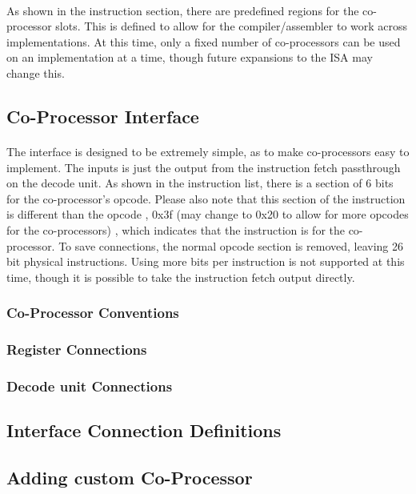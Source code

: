 \documentclass[letterpaper, 11pt]{article}
\begin{document}
\paragraph{}As shown in the instruction section, there are predefined regions for the co-processor slots. 
This is defined to allow for the compiler/assembler to work across implementations. At this time, only a fixed number of co-processors can be used on 
an implementation at a time, though future expansions to the ISA may change this.  

\subsection{Co-Processor Interface}
\paragraph{}The interface is designed to be extremely simple, as to make co-processors easy to implement. The inputs is just the output from the instruction fetch
passthrough on the decode unit. As shown in the instruction list, there is a section of 6 bits for the co-processor's opcode. Please also note
that this section of the instruction is different than the opcode , 0x3f (may change to 0x20 to allow for more opcodes for the co-processors) , which indicates that the instruction is for the co-processor. To save connections, 
the normal opcode section is removed, leaving 26 bit physical instructions. Using more bits per instruction is not supported at this time, though it is possible
to take the instruction fetch output directly. 
\subsubsection{Co-Processor Conventions}
\subsubsection{Register Connections}
\subsubsection{Decode unit Connections}
\subsection{Interface Connection Definitions}
\subsection{Adding custom Co-Processor}
\end{document}
